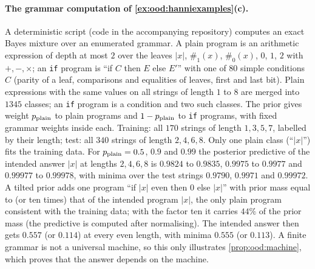 \paragraph{The grammar computation of \cref{ex:ood:hanniexamples}(c).} A deterministic script (code in the accompanying repository) computes an exact Bayes mixture over an enumerated grammar. A plain program is an arithmetic expression of depth at most $2$ over the leaves $|x|$, $\#_1(x)$, $\#_0(x)$, $0$, $1$, $2$ with $+,-,\times$; an \texttt{if} program is ``if $C$ then $E$ else $E'$'' with one of $80$ simple conditions $C$ (parity of a leaf, comparisons and equalities of leaves, first and last bit). Plain expressions with the same values on all strings of length $1$ to $8$ are merged into $1345$ classes; an \texttt{if} program is a condition and two such classes. The prior gives weight $p_{\rm plain}$ to plain programs and $1-p_{\rm plain}$ to \texttt{if} programs, with fixed grammar weights inside each. Training: all $170$ strings of length $1,3,5,7$, labelled by their length; test: all $340$ strings of length $2,4,6,8$. Only one plain class (``$|x|$'') fits the training data. For $p_{\rm plain}=0.5$, $0.9$ and $0.99$ the posterior predictive of the intended answer $|x|$ at lengths $2,4,6,8$ is $0.9824$ to $0.9835$, $0.9975$ to $0.9977$ and $0.99977$ to $0.99978$, with minima over the test strings $0.9790$, $0.9971$ and $0.99972$. A tilted prior adds one program ``if $|x|$ even then $0$ else $|x|$'' with prior mass equal to (or ten times) that of the intended program $|x|$, the only plain program consistent with the training data; with the factor ten it carries $44\%$ of the prior mass (the predictive is computed after normalising). The intended answer then gets $0.557$ (or $0.114$) at every even length, with minima $0.555$ (or $0.113$). A finite grammar is not a universal machine, so this only illustrates \cref{prop:ood:machine}, which proves that the answer depends on the machine.

